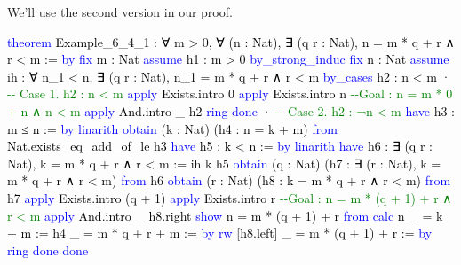 \documentclass[
  letterpaper,
  DIV=11,
  numbers=noendperiod]{scrreprt}
\newenvironment{Shaded}{\begin{snugshade}}{\end{snugshade}}
\newcommand{\CommentTok}[1]{\textcolor[rgb]{0.37,0.37,0.37}{#1}}
\newcommand{\KeywordTok}[1]{\textcolor[rgb]{0.00,0.23,0.31}{#1}}
\newcommand{\NormalTok}[1]{\textcolor[rgb]{0.00,0.23,0.31}{#1}}
\renewcommand{\NormalTok}[1]{\textcolor[HTML]{000000}{#1}}
\renewcommand{\KeywordTok}[1]{\textcolor[HTML]{0000FF}{#1}}
\renewcommand{\CommentTok}[1]{\textcolor[HTML]{008000}{#1}}
\theoremstyle{remark}
\begin{document}
We'll use the second version in our proof.

\begin{Shaded}
\begin{Highlighting}[]
\KeywordTok{theorem}\NormalTok{ Example\_6\_4\_1 : ∀ m \textgreater{} 0, ∀ (n : Nat),}
\NormalTok{    ∃ (q r : Nat), n = m * q + r ∧ r \textless{} m := }\KeywordTok{by}
  \KeywordTok{fix}\NormalTok{ m : Nat}
  \KeywordTok{assume}\NormalTok{ h1 : m \textgreater{} 0}
  \KeywordTok{by\_strong\_induc}
  \KeywordTok{fix}\NormalTok{ n : Nat}
  \KeywordTok{assume}\NormalTok{ ih : ∀ n\_1 \textless{} n, ∃ (q r : Nat), n\_1 = m * q + r ∧ r \textless{} m}
  \KeywordTok{by\_cases}\NormalTok{ h2 : n \textless{} m}
\NormalTok{  · }\CommentTok{{-}{-} Case 1. h2 : n \textless{} m}
    \KeywordTok{apply}\NormalTok{ Exists.intro 0}
    \KeywordTok{apply}\NormalTok{ Exists.intro n     }\CommentTok{{-}{-}Goal : n = m * 0 + n ∧ n \textless{} m}
    \KeywordTok{apply}\NormalTok{ And.intro \_ h2}
    \KeywordTok{ring}
    \KeywordTok{done}
\NormalTok{  · }\CommentTok{{-}{-} Case 2. h2 : ¬n \textless{} m}
    \KeywordTok{have}\NormalTok{ h3 : m ≤ n := }\KeywordTok{by} \KeywordTok{linarith}
    \KeywordTok{obtain}\NormalTok{ (k : Nat) (h4 : n = k + m) }\KeywordTok{from}\NormalTok{ Nat.exists\_eq\_add\_of\_le\textquotesingle{} h3}
    \KeywordTok{have}\NormalTok{ h5 : k \textless{} n := }\KeywordTok{by} \KeywordTok{linarith}
    \KeywordTok{have}\NormalTok{ h6 : ∃ (q r : Nat), k = m * q + r ∧ r \textless{} m := ih k h5}
    \KeywordTok{obtain}\NormalTok{ (q\textquotesingle{} : Nat)}
\NormalTok{      (h7 : ∃ (r : Nat), k = m * q\textquotesingle{} + r ∧ r \textless{} m) }\KeywordTok{from}\NormalTok{ h6}
    \KeywordTok{obtain}\NormalTok{ (r\textquotesingle{} : Nat) (h8 : k = m * q\textquotesingle{} + r\textquotesingle{} ∧ r\textquotesingle{} \textless{} m) }\KeywordTok{from}\NormalTok{ h7}
    \KeywordTok{apply}\NormalTok{ Exists.intro (q\textquotesingle{} + 1)}
    \KeywordTok{apply}\NormalTok{ Exists.intro r\textquotesingle{}     }\CommentTok{{-}{-}Goal : n = m * (q\textquotesingle{} + 1) + r\textquotesingle{} ∧ r\textquotesingle{} \textless{} m}
    \KeywordTok{apply}\NormalTok{ And.intro \_ h8.right}
    \KeywordTok{show}\NormalTok{ n = m * (q\textquotesingle{} + 1) + r\textquotesingle{} }\KeywordTok{from}
      \KeywordTok{calc}\NormalTok{ n}
\NormalTok{        \_ = k + m := h4}
\NormalTok{        \_ = m * q\textquotesingle{} + r\textquotesingle{} + m := }\KeywordTok{by} \KeywordTok{rw}\NormalTok{ [h8.left]}
\NormalTok{        \_ = m * (q\textquotesingle{} + 1) + r\textquotesingle{} := }\KeywordTok{by} \KeywordTok{ring}
    \KeywordTok{done}
  \KeywordTok{done}
\end{Highlighting}
\end{Shaded}
\end{document}
